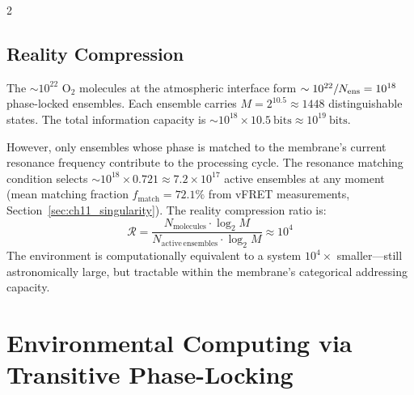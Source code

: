 \begin{multicols}{2}
\subsection{Reality Compression}

The $\sim 10^{22}$ O$_2$ molecules at the atmospheric interface form $\sim 10^{22} / N_{\mathrm{ens}} = 10^{18}$ phase-locked ensembles. Each ensemble carries $M = 2^{10.5} \approx 1448$ distinguishable states. The total information capacity is $\sim 10^{18} \times 10.5\ \mathrm{bits} \approx 10^{19}\ \mathrm{bits}$.

However, only ensembles whose phase is matched to the membrane's current resonance frequency contribute to the processing cycle. The resonance matching condition selects $\sim 10^{18} \times 0.721 \approx 7.2 \times 10^{17}$ active ensembles at any moment (mean matching fraction $f_{\mathrm{match}} = 72.1\%$ from vFRET measurements, Section~\ref{sec:ch11_singularity}). The reality compression ratio is:
\begin{equation}
\mathcal{R} = \frac{N_{\mathrm{molecules}} \cdot \log_2 M}{N_{\mathrm{active\,ensembles}} \cdot \log_2 M} \approx 10^4
\label{eq:ch11_compression}
\end{equation}
The environment is computationally equivalent to a system $10^4\times$ smaller---still astronomically large, but tractable within the membrane's categorical addressing capacity.

\end{multicols}

\section{Environmental Computing via Transitive Phase-Locking}
\label{sec:ch11_envcompute}

